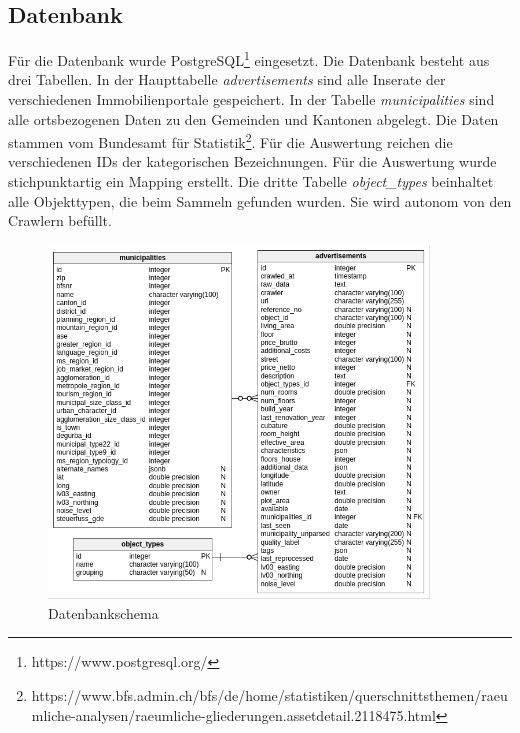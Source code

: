 \subsection{Datenbank}
Für die Datenbank wurde PostgreSQL\footnote{https://www.postgresql.org/} eingesetzt. Die Datenbank besteht aus drei Tabellen. In der Haupttabelle \textit{advertisements} sind alle Inserate der verschiedenen Immobilienportale gespeichert. In der Tabelle \textit{municipalities} sind alle ortsbezogenen Daten zu den Gemeinden und Kantonen abgelegt. Die Daten stammen vom Bundesamt für Statistik\footnote{https://www.bfs.admin.ch/bfs/de/home/statistiken/querschnittsthemen/raeumliche-analysen/raeumliche-gliederungen.assetdetail.2118475.html}. Für die Auswertung reichen die verschiedenen IDs der kategorischen Bezeichnungen. Für die Auswertung wurde stichpunktartig ein Mapping erstellt.
Die dritte Tabelle \textit{object\_types} beinhaltet alle Objekttypen, die beim Sammeln gefunden wurden. Sie wird autonom von den Crawlern befüllt.
\begin{figure}[h!]
\centering
\includegraphics[width=0.9\textwidth]{images/erm.png}
\caption[Datenbankschema]{Datenbankschema}%
\label{fig:db}
\end{figure}
\newline
%
